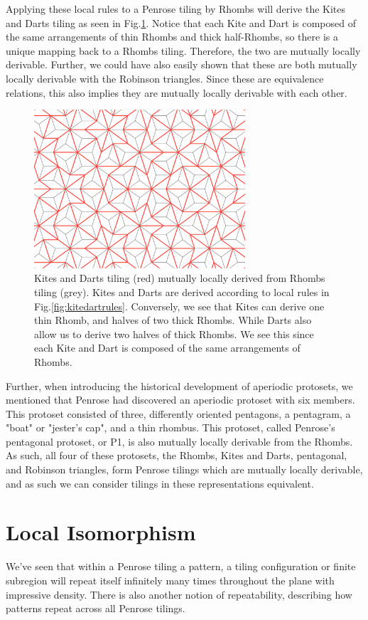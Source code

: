 \documentclass[
  oneside,
  11pt, a4paper,
  footinclude=true,
  headinclude=true,
  cleardoublepage=empty
]{scrbook}
\begin{document}
Applying these local rules to a Penrose tiling by Rhombs will derive the Kites and Darts tiling as seen in Fig.\ref{fig:KiteRules}. Notice that each Kite and Dart is composed of the same arrangements of thin Rhombs and thick half-Rhombs, so there is a unique mapping back to a Rhombs tiling. Therefore, the two are mutually locally derivable. Further, we could have also easily shown that these are both mutually locally derivable with the Robinson triangles. Since these are equivalence relations, this also implies they are mutually locally derivable with each other.

\begin{figure}[H]
\centering
\includegraphics[width=0.7\textwidth]{KiteRules}
\caption[Kites and Darts from Rhombs]{Kites and Darts tiling (red) mutually locally derived from Rhombs tiling (grey). Kites and Darts are derived according to local rules in Fig.\ref{fig:kitedartrules}. Conversely, we see that Kites can derive one thin Rhomb, and halves of two thick Rhombs. While Darts also allow us to derive two halves of thick Rhombs. We see this since each Kite and Dart is composed of the same arrangements of Rhombs.}
\label{fig:KiteRules}
\end{figure}

Further, when introducing the historical development of aperiodic protosets, we mentioned that Penrose had discovered an aperiodic protoset with six members. This protoset consisted of three, differently oriented pentagons, a pentagram, a "boat" or "jester's cap", and a thin rhombus. This protoset, called Penrose's pentagonal protoset, or P1, is also mutually locally derivable from the Rhombs. As such, all four of these protosets, the Rhombs, Kites and Darts, pentagonal, and Robinson triangles, form Penrose tilings which are mutually locally derivable, and as such we can consider tilings in these representations equivalent. 
\section{Local Isomorphism}
 We've seen that within a Penrose tiling a pattern, a tiling configuration or finite subregion will repeat itself infinitely many times throughout the plane with impressive density. There is also another notion of repeatability, describing how patterns repeat across all Penrose tilings.
 
\end{document}
